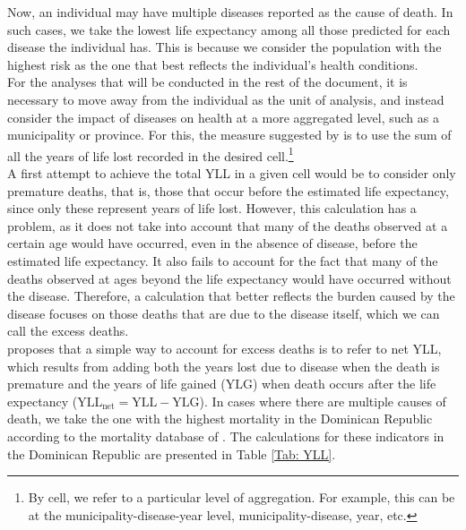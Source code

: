 \documentclass[11pt]{article}
\numberwithin{equation}{section}
\theoremstyle{remark}
\begin{document}
\begin{table}[H]
    \caption{\label{Tab: LE} Life expectancy conditional to disease and sex.}
    \centering
    \scalebox{0.8}{
    \setlength{\extrarowheight}{1pt}
    
    }
\end{table}

Now, an individual may have multiple diseases reported as the cause of death. In such cases, we take the lowest life expectancy among all those predicted for each disease the individual has. This is because we consider the population with the highest risk as the one that best reflects the individual's health conditions.\\

For the analyses that will be conducted in the rest of the document, it is necessary to move away from the individual as the unit of analysis, and instead consider the impact of diseases on health at a more aggregated level, such as a municipality or province. For this, the measure suggested by \citet{Claxton2015} is to use the sum of all the years of life lost recorded in the desired cell.\footnote{By cell, we refer to a particular level of aggregation. For example, this can be at the municipality-disease-year level, municipality-disease, year, etc.}\\

A first attempt to achieve the total YLL in a given cell would be to consider only premature deaths, that is, those that occur before the estimated life expectancy, since only these represent years of life lost. However, this calculation has a problem, as it does not take into account that many of the deaths observed at a certain age would have occurred, even in the absence of disease, before the estimated life expectancy. It also fails to account for the fact that many of the deaths observed at ages beyond the life expectancy would have occurred without the disease. Therefore, a calculation that better reflects the burden caused by the disease focuses on those deaths that are due to the disease itself, which we can call the excess deaths.\\

\citet{Claxton2015} proposes that a simple way to account for excess deaths is to refer to net YLL, which results from adding both the years lost due to disease when the death is premature and the years of life gained ($\text{YLG}$) when death occurs after the life expectancy ($\text{YLL}_{\text{net}}=\text{YLL}-\text{YLG}$). 
In cases where there are multiple causes of death, we take the one with the highest mortality in the Dominican Republic according to the mortality database of \citet{WHO2022}. The calculations for these indicators in the Dominican Republic are presented in Table \ref{Tab: YLL}.\\
\end{document}

